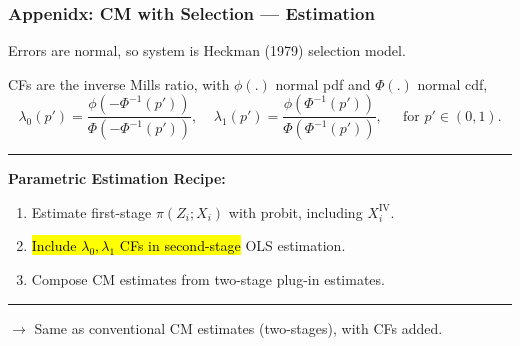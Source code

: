 \documentclass[dvipsnames]{beamer} %
\makeatletter
\renewcommand{\vec}[1]{\boldsymbol{\mathit{#1}}}                           %
\newcommand{\E}[2][]{\mathbb{E}_{#1} \left[ #2 \right]}                    %
\renewcommand{\hat}[1]{\widehat{#1}}                                       %
\renewcommand{\bar}[1]{\overline{#1}}                                      %
\let\HL\hl
\renewcommand\hl{%
    \let\set@color\beamerorig@set@color
    \let\reset@color\beamerorig@reset@color
    \HL}
\makeatother
\begin{document}
\begin{frame}[noframenumbering]
    \frametitle{Appenidx: CM with Selection --- Estimation}
    Errors are normal, so system is Heckman (1979) selection model.

    \vskip0.25cm

    CFs are the inverse Mills ratio, with $\phi(.)$ normal pdf and $\Phi(.)$ normal cdf, 
    \[ \lambda_0(p') =
        \frac{\phi( - \Phi^{-1}(p') )}{\Phi( -\Phi^{-1}(p') )}, \;\;\;\;
    \lambda_1(p') =
        \frac{\phi( \Phi^{-1}(p') )}{\Phi( \Phi^{-1}(p') )},
        \;\;\;\; \text{ for } p' \in (0,1). \]

    \par\noindent\rule{\textwidth}{0.4pt}
    \textbf{Parametric Estimation Recipe:}
    \begin{enumerate}
        \item Estimate first-stage $\pi(Z_i; \vec X_i)$ with probit, including $\vec X_i^{\text{IV}}$.
        \item \hl{Include $\lambda_0, \lambda_1$ CFs in second-stage} OLS estimation.
        \item Compose CM estimates from two-stage plug-in estimates.
    \end{enumerate}
    \vfill

    \par\noindent\rule{\textwidth}{0.4pt}
    $\to$ Same as conventional CM estimates (two-stages), with CFs added.

    \makebox[\textwidth]{\parbox{1.25\textwidth}{
        \small
        \[ \hat{\text{ADE}}
            = \E{\hat\gamma + \hat\delta D_i}, \;\;
        \hat{\text{AIE}}
            = \mathbb E \Bigg[ \, \hat{\bar \pi} \,
                \Big( \hat\beta +  \hat\delta Z_i +
                    \underbrace{ (\hat\rho_1 - \hat\rho_0) \,
                    \Gamma \big(\hat\pi(0; \vec X_i), \, \hat\pi(1; \vec X_i) \big)}_{
                        \text{Mediator compliers extrapolation.}} \Big) \Bigg] \]
    }}
\end{frame}
\end{document}
